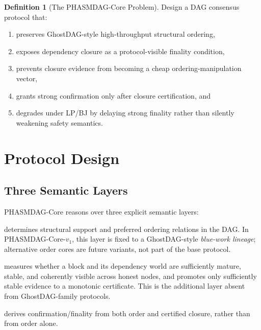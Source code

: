 \documentclass[11pt]{article}
\theoremstyle{definition}
\newtheorem{definition}{Definition}[section]
\theoremstyle{plain}
\theoremstyle{remark}
\begin{document}
\begin{definition}[The PHASMDAG-Core Problem]\label{def:problem}
Design a DAG consensus protocol that:
\begin{enumerate}[nosep]
    \item preserves GhostDAG-style high-throughput structural ordering,
    \item exposes dependency closure as a protocol-visible finality condition,
    \item prevents closure evidence from becoming a cheap
    ordering-manipulation vector,
    \item grants strong confirmation only after closure certification, and
    \item degrades under LP/BJ by delaying strong finality rather than
    silently weakening safety semantics.
\end{enumerate}
\end{definition}

\section{Protocol Design}\label{sec:design}

\subsection{Three Semantic Layers}

PHASMDAG-Core reasons over three explicit semantic layers:

\begin{description}[nosep]
    \item[Layer A --- Order Layer] determines structural support and preferred
    ordering relations in the DAG.  In PHASMDAG-Core-$v_1$, this layer is fixed to a
    GhostDAG-style \emph{blue-work lineage}; alternative order cores are future
    variants, not part of the base protocol.

    \item[Layer B --- Closure Layer] measures whether a block and its dependency
    world are sufficiently mature, stable, and coherently visible across honest
    nodes, and promotes only sufficiently stable evidence to a monotonic
    certificate.  This is the additional layer absent from GhostDAG-family
    protocols.

    \item[Layer C --- Finality Layer] derives confirmation/finality from both
    order and certified closure, rather than from order alone.
\end{description}
\end{document}
